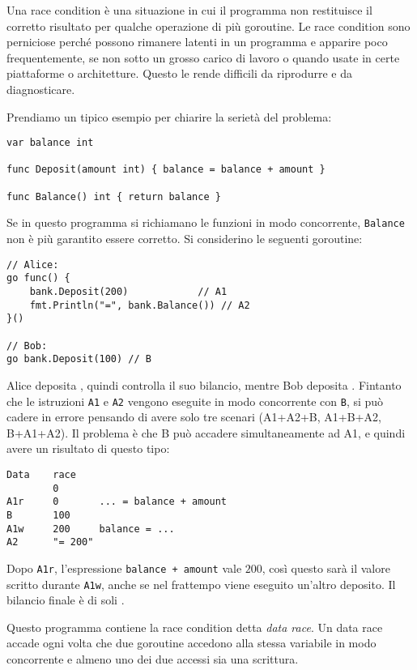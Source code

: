 \documentclass[../../thesis.tex]{subfiles}
\begin{document}
    Una race condition è una situazione in cui il programma non restituisce il corretto risultato per qualche operazione di più goroutine.
    Le race condition sono perniciose perché possono rimanere latenti in un programma e apparire poco frequentemente, se non sotto un grosso carico di lavoro o quando usate in certe piattaforme o architetture.
    Questo le rende difficili da riprodurre e da diagnosticare.
    \hfill \vspace{12pt}

    Prendiamo un tipico esempio per chiarire la serietà del problema:
    \begin{lstlisting}[frame = single, label = {lst:lstlisting9-1.1}]
var balance int

func Deposit(amount int) { balance = balance + amount }

func Balance() int { return balance }
    \end{lstlisting}
    Se in questo programma si richiamano le funzioni in modo concorrente, \verb"Balance" non è più garantito essere corretto.
    \clearpage
    \newpage
    Si considerino le seguenti goroutine:
    \begin{lstlisting}[frame = single, label = {lst:lstlisting9-1.2}]
// Alice:
go func() {
    bank.Deposit(200)		     // A1
    fmt.Println("=", bank.Balance()) // A2
}()

// Bob:
go bank.Deposit(100) // B
    \end{lstlisting}
    Alice deposita , quindi controlla il suo bilancio, mentre Bob deposita .
    Fintanto che le istruzioni \verb"A1" e \verb"A2" vengono eseguite in modo concorrente con \verb"B", si può cadere in errore pensando di avere solo tre scenari (A1+A2+B, A1+B+A2, B+A1+A2).
    Il problema è che B può accadere simultaneamente ad A1, e quindi avere un risultato di questo tipo:
    \begin{lstlisting}[label={lst:lstlisting9-1.3}]
Data	race
        0
A1r     0       ... = balance + amount
B       100
A1w     200     balance = ...
A2      "= 200"
    \end{lstlisting}
    Dopo \verb"A1r", l'espressione \verb"balance + amount" vale $200$, così questo sarà il valore scritto durante \verb"A1w", anche se nel frattempo viene eseguito un'altro deposito.
    Il bilancio finale è di soli .
    \hfill \vspace{12pt}

    Questo programma contiene la race condition detta \textit{data race}.
    Un data race accade ogni volta che due goroutine accedono alla stessa variabile in modo concorrente e almeno uno dei due accessi sia una scrittura.
    \hfill \vspace{12pt}
\end{document}
